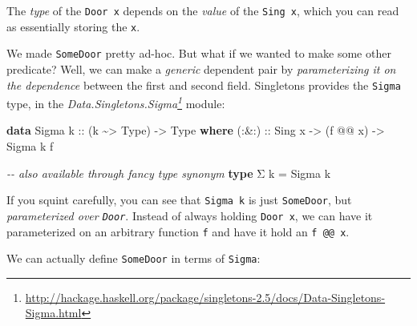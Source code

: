 \documentclass[]{article}
\newenvironment{Shaded}{}{}
\newcommand{\CommentTok}[1]{\textcolor[rgb]{0.38,0.63,0.69}{\textit{#1}}}
\newcommand{\DataTypeTok}[1]{\textcolor[rgb]{0.56,0.13,0.00}{#1}}
\newcommand{\KeywordTok}[1]{\textcolor[rgb]{0.00,0.44,0.13}{\textbf{#1}}}
\newcommand{\NormalTok}[1]{#1}
\newcommand{\OperatorTok}[1]{\textcolor[rgb]{0.40,0.40,0.40}{#1}}
\newcommand{\OtherTok}[1]{\textcolor[rgb]{0.00,0.44,0.13}{#1}}
\renewcommand{\href}[2]{#2\footnote{\url{#1}}}
\begin{document}
The \emph{type} of the \texttt{Door\ x} depends on the \emph{value} of the
\texttt{Sing\ x}, which you can read as essentially storing the \texttt{x}.

We made \texttt{SomeDoor} pretty ad-hoc. But what if we wanted to make some
other predicate? Well, we can make a \emph{generic} dependent pair by
\emph{parameterizing it on the dependence} between the first and second field.
Singletons provides the \texttt{Sigma} type, in the
\emph{\href{http://hackage.haskell.org/package/singletons-2.5/docs/Data-Singletons-Sigma.html}{Data.Singletons.Sigma}}
module:

\begin{Shaded}
\begin{Highlighting}[]
\KeywordTok{data} \DataTypeTok{Sigma}\OtherTok{ k ::}\NormalTok{ (k }\OperatorTok{\textasciitilde{}>} \DataTypeTok{Type}\NormalTok{) }\OtherTok{{-}>} \DataTypeTok{Type} \KeywordTok{where}
\OtherTok{    (:\&:) ::} \DataTypeTok{Sing}\NormalTok{ x }\OtherTok{{-}>}\NormalTok{ (f }\OperatorTok{@@}\NormalTok{ x) }\OtherTok{{-}>} \DataTypeTok{Sigma}\NormalTok{ k f}

\CommentTok{{-}{-} also available through fancy type synonym}
\KeywordTok{type}\NormalTok{ Σ k }\OtherTok{=} \DataTypeTok{Sigma}\NormalTok{ k}
\end{Highlighting}
\end{Shaded}

If you squint carefully, you can see that \texttt{Sigma\ k} is just
\texttt{SomeDoor}, but \emph{parameterized over \texttt{Door}}. Instead of
always holding \texttt{Door\ x}, we can have it parameterized on an arbitrary
function \texttt{f} and have it hold an \texttt{f\ @@\ x}.

We can actually define \texttt{SomeDoor} in terms of \texttt{Sigma}:

\begin{Shaded}
\end{Shaded}
\end{document}
